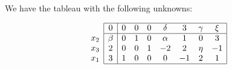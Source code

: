We have the tableau with the following unknowns:


$$
\begin{array}{c}
\\
x_2 \\
x_3 \\ 
x_1 \\
\end{array}
\begin{array}{|c|ccccccc|}
\hline
  0 & 0 & 0 & 0 & \delta & 3 & \gamma & \xi \\ \hline
  \beta & 0 & 1 & 0 & \alpha & 1 & 0 & 3 \\
  2 & 0 & 0 & 1 & -2 & 2 & \eta & -1 \\
  3 & 1 & 0 & 0 & 0 & -1 & 2 & 1 \\ \hline
\end{array}
$$

